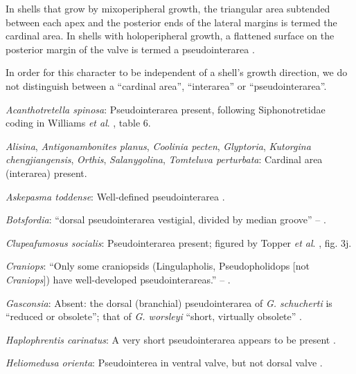 \documentclass[openany]{book}
\theoremstyle{definition}
\theoremstyle{definition}
\theoremstyle{definition}
\theoremstyle{remark}
\begin{document}
In shells that grow by mixoperipheral growth, the triangular area
subtended between each apex and the posterior ends of the lateral
margins is termed the cardinal area. In shells with holoperipheral
growth, a flattened surface on the posterior margin of the valve is
termed a pseudointerarea
\citep[paraphrasing][]{Williams1997Introduction}.

In order for this character to be independent of a shell's growth
direction, we do not distinguish between a ``cardinal area'',
``interarea'' or ``pseudointerarea''.

\hypertarget{Acanthotretella_spinosa-coding-24}{}
\emph{Acanthotretella spinosa}: Pseudointerarea present, following
Siphonotretidae coding in Williams \emph{et al}.
\citeyearpar{Williams2000LinguliformeaCraniiformea}, table 6.

\hypertarget{Alisina-coding-24}{}
\emph{Alisina}, \emph{Antigonambonites planus}, \emph{Coolinia pecten},
\emph{Glyptoria}, \emph{Kutorgina chengjiangensis}, \emph{Orthis},
\emph{Salanygolina}, \emph{Tomteluva perturbata}: Cardinal area
(interarea) present.

\hypertarget{Askepasma_toddense-coding-24}{}
\emph{Askepasma toddense}: Well-defined pseudointerarea
\citep[p153]{Williams2000LinguliformeaCraniiformea}.

\hypertarget{Botsfordia-coding-24}{}
\emph{Botsfordia}: ``dorsal pseudointerarea vestigial, divided by median
groove'' -- \citet{Williams2000LinguliformeaCraniiformea}.

\hypertarget{Clupeafumosus_socialis-coding-24}{}
\emph{Clupeafumosus socialis}: Pseudointerarea present; figured by
Topper \emph{et al}. \citeyearpar{Topper2013Reappraisalof}, fig. 3j.

\hypertarget{Craniops-coding-24}{}
\emph{Craniops}: ``Only some craniopsids (Lingulapholis, Pseudopholidops
{[}not \emph{Craniops}{]}) have well-developed pseudointerareas.'' --
\citet{Williams2000LinguliformeaCraniiformea}.

\hypertarget{Gasconsia-coding-24}{}
\emph{Gasconsia}: Absent: the dorsal (branchial) pseudointerarea of
\emph{G. schucherti} is ``reduced or obsolete''; that of \emph{G.
worsleyi} ``short, virtually obsolete'' \citep{Hanken1985Thetaxonomy}.

\hypertarget{Haplophrentis_carinatus-coding-24}{}
\emph{Haplophrentis carinatus}: A very short pseudointerarea appears to
be present \citep{Moysiuk2017Hyolithsare}.

\hypertarget{Heliomedusa_orienta-coding-24}{}
\emph{Heliomedusa orienta}: Pseudointerea in ventral valve, but not
dorsal valve \citep[2007]{Williams2000LinguliformeaCraniiformea}.
\end{document}
